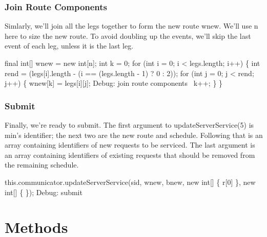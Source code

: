 \subsubsection{Join Route Components}

Simlarly, we'll join all the legs together to form the new route
{\Tt{}wnew\nwendquote}. We'll use {\Tt{}n\nwendquote} here to size the new route. To avoid doubling
up the events, we'll skip the last event of each leg, unless it is the last
leg.

\nwenddocs{}\endmoddef\nwstartdeflinemarkup{}\nwenddeflinemarkup
final int[] wnew = new int[n];
int k = 0;
for (int i = 0; i < legs.length; i++) \{
  int rend = (legs[i].length - (i == (legs.length - 1) ? 0 : 2));
  for (int j = 0; j < rend; j++) \{
    wnew[k] = legs[i][j];
    \LA{}Debug: join route components~{\nwtagstyle{}}\RA{}
    k++;
  \}
\}
\nwendcode{}\nwdocspar

\subsubsection{Submit}

Finally, we're ready to submit. The first argument to {\Tt{}updateServerService\nwendquote}(5)
is {\Tt{}min\nwendquote}'s identifier; the next two are the new route and schedule. Following
that is an array containing identifiers of new requests to be serviced.
The last argument is an array containing identifiers of existing requests
that should be removed from the remaining schedule.

\nwenddocs{}\endmoddef\nwstartdeflinemarkup{}\nwenddeflinemarkup
this.communicator.updateServerService(sid, wnew, bnew,
    new int[] \{ r[0] \}, new int[] \{ \});
\LA{}Debug: submit~{\nwtagstyle{}}\RA{}
\nwendcode{}\nwdocspar


\section{Methods}
\label{client-nearest: methods}

